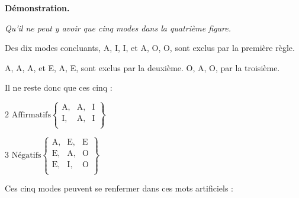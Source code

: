 \begin{center}{\bfseries Démonstration.}\end{center}

	\emph{Qu'il ne peut y avoir que cinq modes dans la quatrième figure.}

Des dix modes concluants, A, I, I, et A, O, O, sont exclus par la première règle.

A, A, A, et E, A, E, sont exclus par la deuxième. O, A, O, par la troisième.

Il ne reste donc que ces cinq :

\begin{center}
$ \text {2 Affirmatifs} \left \{
    \begin{array}{ccc}
	    \text {A,} & \text{A,} & \text{I} \\
  	    \text {I,} & \text{A,} & \text{I} \\
    \end{array}
	    \right \} $
\end{center}
\begin{center}
$ \text {3 Négatifs} \left \{
    \begin{array}{ccc}
	    \text {A,} & \text{E,} & \text{E} \\
	    \text {E,} & \text{A,} & \text{O} \\
	    \text {E,} & \text{I,} & \text{O} \\
    \end{array}
	    \right \} $
\end{center}

Ces cinq modes peuvent se renfermer dans ces mots artificiels :

\newpage

